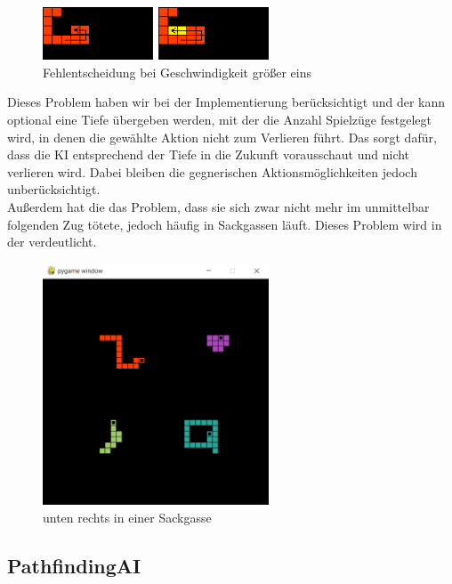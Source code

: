 \begin{figure}[htb]
    \centering
    \includegraphics[width=0.6\textwidth]{Bilder/geschwindigkeit_problem.png}
    \caption{ Fehlentscheidung bei Geschwindigkeit größer eins}
    \label{fig:Geschwindigkeit-Problem}
\end{figure}

Dieses Problem haben wir bei der Implementierung berücksichtigt und der  kann optional eine
Tiefe übergeben werden, mit der die Anzahl Spielzüge festgelegt wird, in denen die gewählte Aktion nicht zum Verlieren
führt.
Das sorgt dafür, dass die \ac{KI} entsprechend der Tiefe in die Zukunft vorausschaut und nicht verlieren wird.
Dabei bleiben die gegnerischen Aktionsmöglichkeiten jedoch unberücksichtigt. \\

Außerdem hat die  das Problem, dass sie sich zwar nicht mehr im unmittelbar
folgenden Zug tötete, jedoch häufig in Sackgassen läuft.
Dieses Problem wird in der  verdeutlicht.

\begin{figure}[htb]
    \centering
    \includegraphics[width=0.6\textwidth]{Bilder/Sackgassen_Problem.png}
    \caption{ unten rechts in einer Sackgasse}
    \label{fig:Sackgassen-Problem}
\end{figure}

\subsection{PathfindingAI}
\label{subsec:pathfinding-ai}

